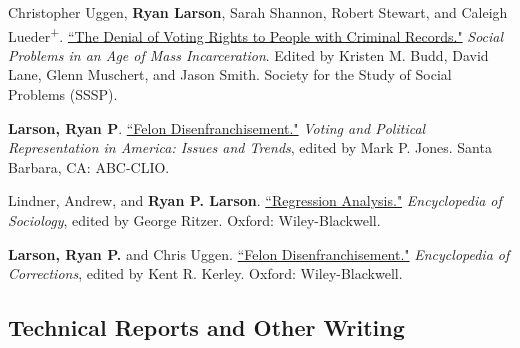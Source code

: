 \documentclass[letterpaper]{article}
\newenvironment{publist}{%
  \begin{list}{}{%
    \setlength{\leftmargin}{0cm}   %
    \setlength{\labelwidth}{2cm}     %
    \setlength{\labelsep}{0.5cm}     %
  }%
}{%
  \end{list}%
}
\begin{document}
\begin{publist}

\item[\textbf{2023}] Christopher Uggen, \textbf{Ryan Larson}, Sarah Shannon, Robert Stewart, and Caleigh Lueder\textsuperscript{+}. \href{https://ryanplarson.github.io/personal_site/pubs/uggen_etal_23.pdf}{``The Denial of Voting Rights to People with Criminal Records."} \textit{Social Problems in an Age of Mass Incarceration}. Edited by Kristen M. Budd, David Lane, Glenn Muschert, and Jason Smith. Society for the Study of Social Problems (SSSP).

\item[\textbf{2020}] \textbf{Larson, Ryan P}. \href{https://ryanplarson.github.io/personal_site/pubs/larson_19.pdf}{``Felon Disenfranchisement."} \textit{Voting and Political Representation in America: Issues and Trends}, edited by Mark P. Jones. Santa Barbara, CA: ABC-CLIO.

\item[\textbf{2018}] Lindner, Andrew, and \textbf{Ryan P. Larson}. \href{https://ryanplarson.github.io/personal_site/pubs/lindner_larson_18.pdf}{``Regression Analysis."} \textit{Encyclopedia of Sociology}, edited by George Ritzer. Oxford: Wiley-Blackwell.

\item[\textbf{2017}] \textbf{Larson, Ryan P.} and Chris Uggen. \href{https://ryanplarson.github.io/personal_site/pubs/uggen_larson_17.pdf}{``Felon Disenfranchisement."} \textit{Encyclopedia of Corrections}, edited by Kent R. Kerley. Oxford: Wiley-Blackwell.

\end{publist}


\subsection*{Technical Reports and Other Writing}
\end{document}
